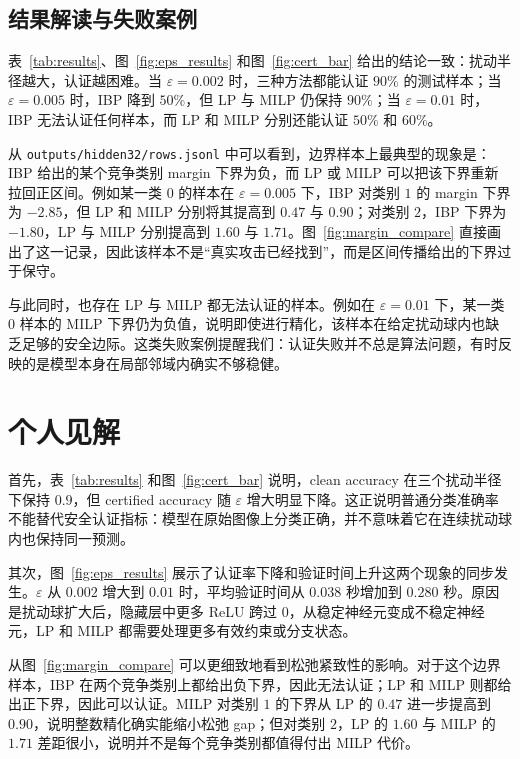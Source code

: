 \documentclass[11pt,a4paper]{ctexart}
\begin{document}
\subsection{结果解读与失败案例}
表~\ref{tab:results}、图~\ref{fig:eps_results} 和图~\ref{fig:cert_bar} 给出的结论一致：扰动半径越大，认证越困难。当 $\varepsilon=0.002$ 时，三种方法都能认证 $90\%$ 的测试样本；当 $\varepsilon=0.005$ 时，IBP 降到 $50\%$，但 LP 与 MILP 仍保持 $90\%$；当 $\varepsilon=0.01$ 时，IBP 无法认证任何样本，而 LP 和 MILP 分别还能认证 $50\%$ 和 $60\%$。

从 \texttt{outputs/hidden32/rows.jsonl} 中可以看到，边界样本上最典型的现象是：IBP 给出的某个竞争类别 margin 下界为负，而 LP 或 MILP 可以把该下界重新拉回正区间。例如某一类 $0$ 的样本在 $\varepsilon=0.005$ 下，IBP 对类别 $1$ 的 margin 下界为 $-2.85$，但 LP 和 MILP 分别将其提高到 $0.47$ 与 $0.90$；对类别 $2$，IBP 下界为 $-1.80$，LP 与 MILP 分别提高到 $1.60$ 与 $1.71$。图~\ref{fig:margin_compare} 直接画出了这一记录，因此该样本不是“真实攻击已经找到”，而是区间传播给出的下界过于保守。

与此同时，也存在 LP 与 MILP 都无法认证的样本。例如在 $\varepsilon=0.01$ 下，某一类 $0$ 样本的 MILP 下界仍为负值，说明即使进行精化，该样本在给定扰动球内也缺乏足够的安全边际。这类失败案例提醒我们：认证失败并不总是算法问题，有时反映的是模型本身在局部邻域内确实不够稳健。
\FloatBarrier

\section{个人见解}
首先，表~\ref{tab:results} 和图~\ref{fig:cert_bar} 说明，clean accuracy 在三个扰动半径下保持 $0.9$，但 certified accuracy 随 $\varepsilon$ 增大明显下降。这正说明普通分类准确率不能替代安全认证指标：模型在原始图像上分类正确，并不意味着它在连续扰动球内也保持同一预测。

其次，图~\ref{fig:eps_results} 展示了认证率下降和验证时间上升这两个现象的同步发生。$\varepsilon$ 从 $0.002$ 增大到 $0.01$ 时，平均验证时间从 $0.038$ 秒增加到 $0.280$ 秒。原因是扰动球扩大后，隐藏层中更多 ReLU 跨过 $0$，从稳定神经元变成不稳定神经元，LP 和 MILP 都需要处理更多有效约束或分支状态。

从图~\ref{fig:margin_compare} 可以更细致地看到松弛紧致性的影响。对于这个边界样本，IBP 在两个竞争类别上都给出负下界，因此无法认证；LP 和 MILP 则都给出正下界，因此可以认证。MILP 对类别 $1$ 的下界从 LP 的 $0.47$ 进一步提高到 $0.90$，说明整数精化确实能缩小松弛 gap；但对类别 $2$，LP 的 $1.60$ 与 MILP 的 $1.71$ 差距很小，说明并不是每个竞争类别都值得付出 MILP 代价。
\end{document}
